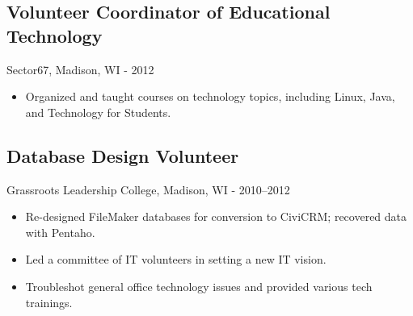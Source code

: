 \documentclass[../main.tex]{subfiles}
\begin{document}
	\subsection*{Volunteer Coordinator of Educational Technology}
	Sector67, Madison, WI - 2012
	\begin{itemize}
		\item{Organized and taught courses on technology topics, including Linux, Java, and Technology for Students.}
	\end{itemize}

	\subsection*{Database Design Volunteer}
	Grassroots Leadership College, Madison, WI - 2010--2012
	\begin{itemize}
		\item{Re-designed FileMaker databases for conversion to CiviCRM; recovered data with Pentaho.}
		\item{Led a committee of IT volunteers in setting a new IT vision.}
		\item{Troubleshot general office technology issues and provided various tech trainings.}
	\end{itemize}
\end{document}
